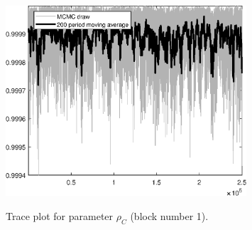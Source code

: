 \begin{figure}[H]
\centering
  \includegraphics[width=0.8\textwidth]{BRS_growth_ext_util/graphs/TracePlot_rho_C_blck_1}\\
    \caption{Trace plot for parameter ${\rho_C}$ (block number 1).}
\end{figure}
